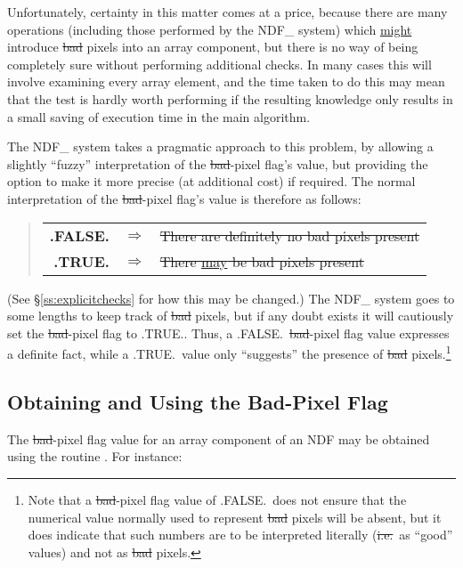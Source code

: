 Unfortunately, certainty in this matter comes at a price, because there are
many operations (including those performed by the NDF\_ system) which
\underline{might} introduce \st{bad\/} pixels into an array component, but
there is no way of being completely sure without performing additional
checks. 
In many cases this will involve examining every array element, and the time
taken to do this may mean that the test is hardly worth performing if the
resulting knowledge only results in a small saving of execution time in the
main algorithm. 

The NDF\_ system takes a pragmatic approach to this problem, by allowing a
slightly ``fuzzy'' interpretation of the \st{bad\/}-pixel flag's value, but
providing the option to make it more precise (at additional cost) if
required. 
The normal interpretation of the \st{bad\/}-pixel flag's value is therefore
as follows: 

\small
\begin{quote}
\begin{center}
\begin{tabular}{rcl}
{\bf .FALSE.} & $\Rightarrow$ & \st{There are definitely no bad pixels 
present}\\
{\bf .TRUE.} & $\Rightarrow$ & \st{There \underline{may} be bad pixels
present} 
\end{tabular}
\end{center}
\end{quote}
\normalsize

(See \S\ref{ss:explicitchecks} for how this may be changed.)
The NDF\_ system goes to some lengths to keep track of \st{bad\/} pixels, but if
any doubt exists it will cautiously set the \st{bad\/}-pixel flag to .TRUE.. 
Thus, a .FALSE.\ \st{bad\/}-pixel flag value expresses a definite fact, while
a .TRUE.\ value only ``suggests'' the presence of \st{bad\/}
pixels.\footnote{Note that a \st{bad\/}-pixel flag value of .FALSE.\ does not
ensure that the numerical value normally used to represent \st{bad\/} pixels
will be absent, but it does indicate that such numbers are to be interpreted
literally (\st{i.e.}\ as ``good'' values) and not as \st{bad\/} pixels.} 

\subsection{\label{ss:usingbadpixflag}Obtaining and Using the Bad-Pixel Flag}

The \st{bad\/}-pixel flag value for an array component of an NDF may be
obtained using the routine . 
For instance:

